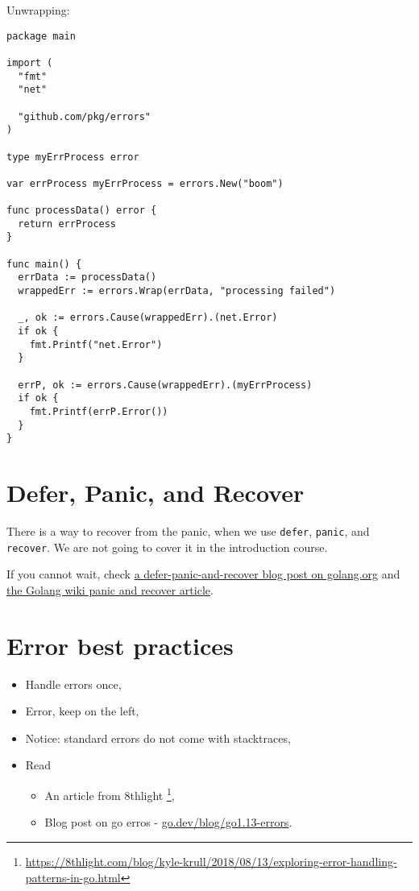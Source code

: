 \documentclass[11pt, letterpaper]{article}
\begin{document}
Unwrapping:

\begin{verbatim}
package main

import (
  "fmt"
  "net"

  "github.com/pkg/errors"
)

type myErrProcess error

var errProcess myErrProcess = errors.New("boom")

func processData() error {
  return errProcess
}

func main() {
  errData := processData()
  wrappedErr := errors.Wrap(errData, "processing failed")

  _, ok := errors.Cause(wrappedErr).(net.Error)
  if ok {
    fmt.Printf("net.Error")
  }

  errP, ok := errors.Cause(wrappedErr).(myErrProcess)
  if ok {
    fmt.Printf(errP.Error())
  }
}
\end{verbatim}

\section{Defer, Panic, and Recover}

There is a way to recover from the panic, when we use \texttt{defer}, \texttt{panic}, and \texttt{recover}. We are not going to cover it in the introduction course.

If you cannot wait, check \href{https://blog.golang.org/defer-panic-and-recover}{a defer-panic-and-recover blog post on golang.org} and \href{https://github.com/golang/go/wiki/PanicAndRecover}{the Golang wiki panic and recover article}.

\section{Error best practices}

\begin{itemize}
\item Handle errors once,
\item Error, keep on the left,
\item Notice: standard errors do not come with stacktraces,
\item Read \begin{itemize}
\item An article from 8thlight \footnote{\href{https://8thlight.com/blog/kyle-krull/2018/08/13/exploring-error-handling-patterns-in-go.html}{https://8thlight.com/blog/kyle-krull/2018/08/13/exploring-error-handling-patterns-in-go.html}},
\item Blog post on go erros - \href{https://go.dev/blog/go1.13-errors}{go.dev/blog/go1.13-errors}.
\end{itemize}
\end{itemize}
\end{document}
